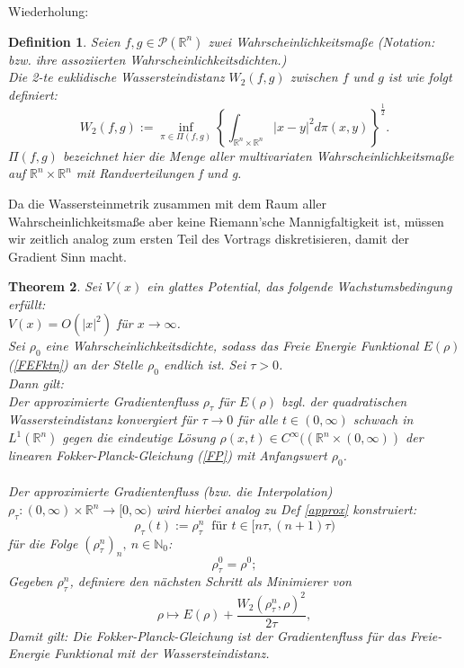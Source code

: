 \documentclass[11pt,a4paper,notitlepage]{scrreprt}
\newcommand{\RR}{\mathbb{R}}
\newcommand{\NN}{\mathbb{N}}
\newtheorem{defi}{Definition}[section]
\newtheorem{theorem}[defi]{Theorem}
\begin{document}
Wiederholung:
\begin{defi}
Seien $f,g\in\mathcal{P}(\RR^n)$ zwei Wahrscheinlichkeitsmaße (Notation: bzw. ihre assoziierten Wahrscheinlichkeitsdichten.)\\
Die 2-te euklidische Wassersteindistanz $W_2(f,g)$ zwischen $f$ und $g$ ist wie folgt definiert:
\begin{equation}
W_2(f,g):=\inf_{\pi \in \Pi(f,g)} \left\{ \int_{\RR^n\times\RR^n} \vert x-y \vert^2 d\pi(x,y)\right\}^\frac{1}{2}.\label{W2}
\end{equation}
$\Pi(f,g)$ bezeichnet hier die Menge aller multivariaten Wahrscheinlichkeitsmaße auf $\RR^n \times \RR^n$ mit Randverteilungen f und g.
\end{defi}
Da die Wassersteinmetrik zusammen mit dem Raum aller Wahrscheinlichkeitsmaße aber keine Riemann'sche Mannigfaltigkeit ist, müssen wir zeitlich analog zum ersten Teil des Vortrags diskretisieren, damit der Gradient Sinn macht.\\


\begin{theorem}
Sei $V(x)$ ein glattes Potential, das folgende Wachstumsbedingung erfüllt: \\$V(x)=O(\vert x \vert^2)$ für $x\to\infty$. \\
Sei $\rho_0$ eine Wahrscheinlichkeitsdichte, sodass das Freie Energie Funktional $E(\rho)$ (\ref{FEFktn}) an der Stelle $\rho_0$ endlich ist. Sei $\tau>0$.\\
Dann gilt: \\
Der approximierte Gradientenfluss $\rho_\tau$  für $E(\rho)$ bzgl. der quadratischen Wassersteindistanz konvergiert für $\tau\to 0$ für alle $t\in(0,\infty)$ schwach in $L^1(\RR^n)$ gegen die eindeutige Lösung $\rho(x,t)\in C^\infty((\RR^n\times(0,\infty))$ der linearen Fokker-Planck-Gleichung (\ref{FP}) mit Anfangswert $\rho_0$.\\\\
Der approximierte Gradientenfluss (bzw. die Interpolation) $\rho_\tau:(0,\infty)\times\RR^n\to[0,\infty)$ wird hierbei analog zu Def \ref{approx} konstruiert:
\begin{equation}
\rho_\tau(t):=\rho_\tau^n ~\text{ für }t\in[n\tau,(n+1)\tau)
\end{equation}
für die Folge $(\rho_\tau^n)_n,~n\in\NN_0$:
\[\rho_\tau^0=\rho^0; \]
Gegeben $\rho_\tau^n$, definiere den nächsten Schritt als Minimierer von
\begin{equation} \rho \mapsto E(\rho)+\dfrac{W_2(\rho_\tau^n,\rho)^2}{2\tau}, \label{rho^n}
\end{equation}
Damit gilt: Die Fokker-Planck-Gleichung ist der Gradientenfluss für das Freie-Energie Funktional mit der Wassersteindistanz.
\end{theorem}
\end{document}
